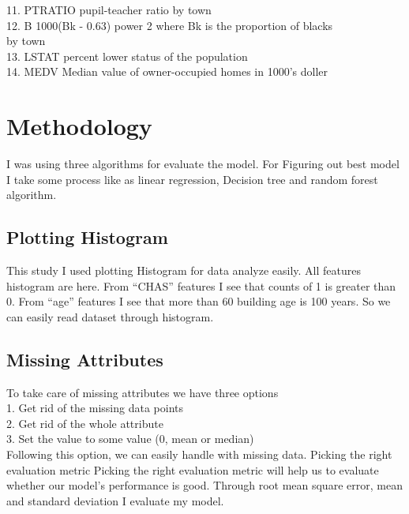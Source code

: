 \documentclass[conference]{IEEEtran}
\begin{document}
11. PTRATIO  pupil-teacher ratio by town\\
12. B        1000(Bk - 0.63) power 2 where Bk is the proportion of blacks\\ by town\\
13. LSTAT    percent lower status of the population\\
14. MEDV     Median value of owner-occupied homes in 1000's doller\\

\section{Methodology}
I was using three algorithms for evaluate the model. For Figuring out best model I take some process like as linear regression, Decision tree and random forest algorithm.
\subsection{Plotting Histogram}\label{AA} This study I used plotting Histogram for data analyze easily. All features histogram are here. From “CHAS” features I see that counts of 1 is greater than 0. From “age” features I see that more than 60 building age is 100 years. So we can easily read dataset through histogram.


\subsection{Missing Attributes}\label{AA}
To take care of missing attributes we have three options\\ 
1. Get rid of the missing data points \\
2. Get rid of the whole attribute \\
3. Set the value to some value (0, mean or median) \\
Following this option, we can easily handle with missing data. Picking the right evaluation metric Picking the right evaluation metric will help us to evaluate whether our model’s performance is good. Through root mean square error, mean and standard deviation I evaluate my model.
\end{document}
